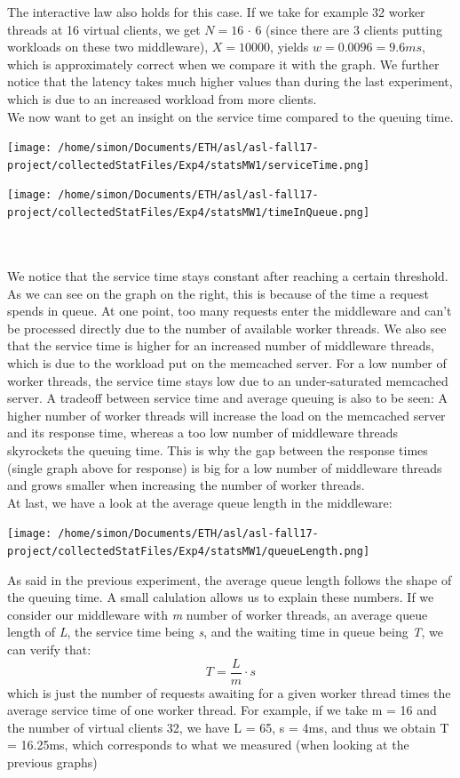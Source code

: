 \documentclass[11pt,a4paper]{article}
\begin{document}
The interactive law also holds for this case. If we take for example 32 worker threads at 16 virtual clients, we get \(N = 16\) $\cdot$ 6 (since there are 3 clients putting workloads on these two middleware), \(X = 10000\), yields \(w = 0.0096 = 9.6 ms\), which is approximately correct when we compare it with the graph. 
We further notice that the latency takes much higher values than during the last experiment, which is due to an increased workload from more clients. 
\\
We now want to get an insight on the service time compared to the queuing time.
\\
\begin{minipage}{0.5\linewidth}
\texttt{[image: /home/simon/Documents/ETH/asl/asl-fall17-project/collectedStatFiles/Exp4/statsMW1/serviceTime.png]}
\end{minipage}
\hfill
\begin{minipage}{0.5\linewidth}
\texttt{[image: /home/simon/Documents/ETH/asl/asl-fall17-project/collectedStatFiles/Exp4/statsMW1/timeInQueue.png]}
\end{minipage}
\\\\
We notice that the service time stays constant after reaching a certain threshold. As we can see on the graph on the right, this is because of the time a request spends in queue. At one point, too many requests enter the middleware and can't be processed directly due to the number of available worker threads. We also see that the service time is higher for an increased number of middleware threads, which is due to the workload  put on the memcached server. For a low number of worker threads, the service time stays low due to an under-saturated memcached server. 
A tradeoff between service time and average queuing is also to be seen: A higher number of worker threads will increase the load on the memcached server and its response time, whereas a too low number of middleware threads skyrockets the queuing time. This is why the gap between the response times (single graph above for response) is big for a low number of middleware threads and grows smaller when increasing the number of worker threads. 
\\
At last, we have a look at the average queue length in the middleware:
\begin{center}
\texttt{[image: /home/simon/Documents/ETH/asl/asl-fall17-project/collectedStatFiles/Exp4/statsMW1/queueLength.png]}
\end{center}
As said in the previous experiment, the average queue length follows the shape of the queuing time. A small calulation allows us to explain these numbers. 
If we consider our middleware with \textit{m} number of worker threads, an average queue length of \textit{L}, the service time being \textit{s}, and the waiting time in queue being \textit{T}, we can verify that: 
\[ T = \frac{L}{m}\cdot s \]
which is just the number of requests awaiting for a given worker thread times the average service time of one worker thread. For example, if we take m = 16 and the number of virtual clients 32, we have L = 65, s = 4ms, and thus we obtain T = 16.25ms, which corresponds to what we measured (when looking at the previous graphs)
\end{document}
